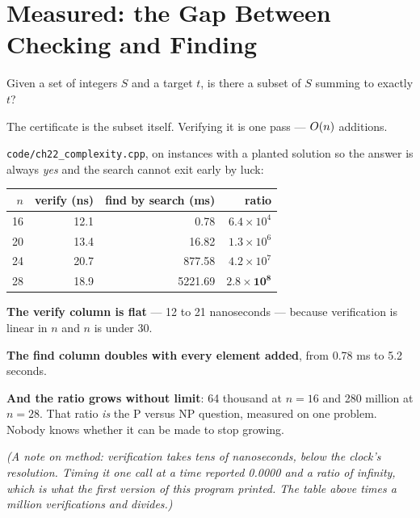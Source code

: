 \section{Measured: the Gap Between Checking and Finding}

\begin{definitionbox}
Given a set of integers $S$ and a target $t$, is there a subset of $S$ summing
to exactly $t$?

\smallskip
The certificate is the subset itself. Verifying it is one pass --- $O(n)$
additions.
\end{definitionbox}

\begin{worked}
\texttt{code/ch22\_complexity.cpp}, on instances with a planted solution so the
answer is always \emph{yes} and the search cannot exit early by luck:

\begin{center}
\begin{tabular}{@{}rrrr@{}}
\toprule
\rowcolor{primary!15}
$n$ & verify (ns) & find by search (ms) & ratio \\
\midrule
16 & 12.1 &    0.78 & $6.4 \times 10^{4}$ \\
20 & 13.4 &   16.82 & $1.3 \times 10^{6}$ \\
24 & 20.7 &  877.58 & $4.2 \times 10^{7}$ \\
28 & 18.9 & 5221.69 & $\mathbf{2.8 \times 10^{8}}$ \\
\bottomrule
\end{tabular}
\end{center}

\smallskip
\textbf{The verify column is flat} --- 12 to 21 nanoseconds --- because
verification is linear in $n$ and $n$ is under 30.

\smallskip
\textbf{The find column doubles with every element added}, from 0.78 ms to 5.2
seconds.

\smallskip
\textbf{And the ratio grows without limit}: 64 thousand at $n = 16$ and 280
million at $n = 28$. That ratio \emph{is} the P versus NP question, measured on
one problem. Nobody knows whether it can be made to stop growing.

\smallskip
\textit{(A note on method: verification takes tens of nanoseconds, below the
clock's resolution. Timing it one call at a time reported 0.0000 and a ratio of
infinity, which is what the first version of this program printed. The table
above times a million verifications and divides.)}
\end{worked}

